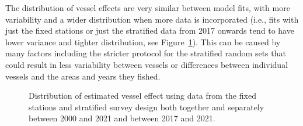 \documentclass[12pt]{article}\usepackage[]{graphicx}\usepackage[]{color}
\begin{document}
\endgroup{} \endgroup{}

The distribution of vessel effects are very similar between model fits, with more variability and a wider distribution when more data is incorporated (i.e., fits with just the fixed stations or just the stratified data from 2017 onwards tend to have lower variance and tighter distribution, see Figure~\ref{fig:vess-eff}). This can be caused by many factors including the stricter protocol for the stratified random sets that could result in less variability between vessels or differences between individual vessels and the areas and years they fished.
\begin{figure}[htb]

{\centering {}  

}

\caption{Distribution of estimated vessel effect using data from the fixed stations and stratified survey design both together and separately between 2000 and 2021 and between 2017 and 2021.}\label{fig:vess-eff}
\end{figure}
\end{document}
